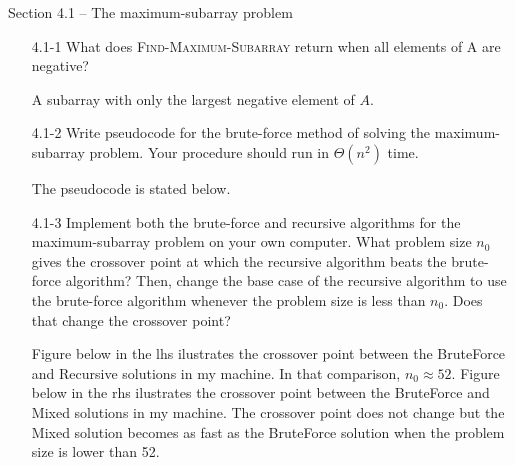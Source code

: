 \documentclass{report}
\makeatletter
\renewenvironment{framed}{%
 \def\FrameCommand##1{\hskip\@totalleftmargin
 \fboxsep=\FrameSep\fbox{##1}}%
 \MakeFramed {\advance\hsize-\width
   \@totalleftmargin\z@ \linewidth\hsize
   \@setminipage}}%
 {\par\unskip\endMakeFramed}
\makeatother
\begin{document}
\small

{\large Section 4.1 {--} The maximum-subarray problem}

\begin{enumerate}

\item[4.1{-}1]{What does \textsc{Find-Maximum-Subarray} return when all
elements of A are negative?}

\begin{framed}
A subarray with only the largest negative element of $A$.
\end{framed}

\item[4.1{-}2]{Write pseudocode for the brute-force method of solving the
maximum-subarray problem. Your procedure should run in $\Theta(n^2)$ time.}

\begin{framed}
The pseudocode is stated below.\\
\begin{algorithm}[H]
\SetAlgoNoEnd\DontPrintSemicolon
\BlankLine
{}
\end{algorithm}
\end{framed}

\item[4.1{-}3]{Implement both the brute-force and recursive algorithms for the
maximum-subarray problem on your own computer. What problem size $n_0$ gives
the crossover point at which the recursive algorithm beats the brute-force
algorithm? Then, change the base case of the recursive algorithm to use the
brute-force algorithm whenever the problem size is less than $n_0$. Does
that change the crossover point?}



\begin{framed}
Figure below in the lhs ilustrates the crossover point between the
BruteForce and Recursive solutions in my machine. In that comparison, $n_0
\approx 52$. Figure below in the rhs ilustrates the crossover point
between the BruteForce and Mixed solutions in my machine. The crossover point
does not change but the Mixed solution becomes as fast as the BruteForce
solution when the problem size is lower than 52.


\end{framed}
\end{enumerate}
\end{document}
